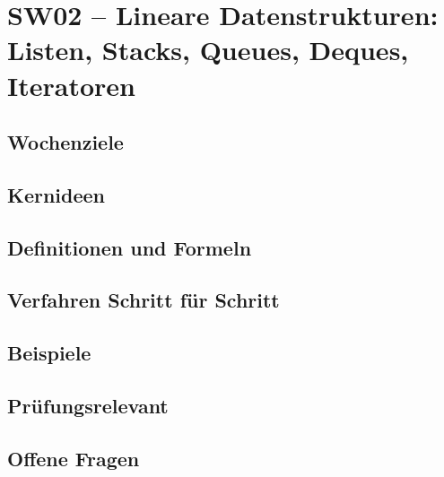 \chapter{SW02 – Lineare Datenstrukturen: Listen, Stacks, Queues, Deques, Iteratoren}
\label{kap:sw02}

\section*{Wochenziele}
\begin{wochenziele}
\end{wochenziele}

\section{Kernideen}

\section{Definitionen und Formeln}

\section{Verfahren Schritt für Schritt}

\section{Beispiele}

\section{Prüfungsrelevant}

\section{Offene Fragen}
